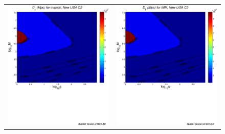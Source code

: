\documentclass{iopart}
\begin{document}
\begin{figure}[H]
\begin{center}
\begin{tabular}{cc}
\includegraphics[scale=0.41,clip=true]{FigEmanuele/C3InspDLContour.ps}
&\includegraphics[scale=0.41,clip=true]{FigEmanuele/C3IMRDLContour.ps}\\

\end{tabular}
\end{center}
\end{figure}
\end{document}

